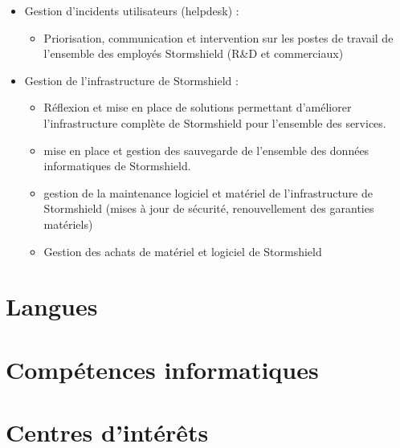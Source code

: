 \documentclass[11pt,a4paper,sans]{moderncv}
\begin{document}
                {
                    \begin{itemize}
                    \item Gestion d'incidents utilisateurs (helpdesk) :
                             \begin{itemize}
                              \item Priorisation, communication et intervention sur les postes de travail de l'ensemble des employés Stormshield (R\&D et commerciaux)
                             \end{itemize}
                     \end{itemize}
                     \begin{itemize}
                     \item Gestion de l'infrastructure de Stormshield :
                             \begin{itemize}
                             \item Réflexion et mise en place de solutions permettant d'améliorer l'infrastructure complète de Stormshield pour l'ensemble des services.
                             \item mise en place et gestion des sauvegarde de l'ensemble des données informatiques de Stormshield.
                             \item gestion de la maintenance logiciel et matériel de l'infrastructure de Stormshield (mises à jour de sécurité, renouvellement des garanties matériels)
                             \item Gestion des achats de matériel et logiciel de Stormshield
                             \end{itemize}
                     \end{itemize}
		} 	
\section{Langues}
\section{Compétences informatiques}
\section{Centres d'intérêts}
\end{document}
